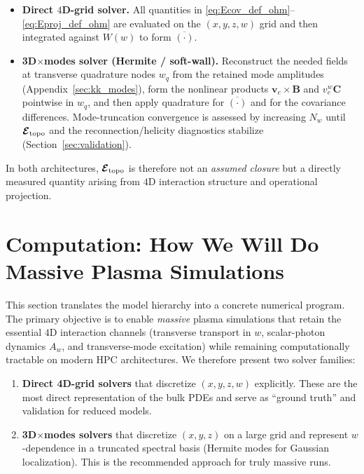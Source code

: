 \documentclass[11pt]{article}
\begin{document}
\begin{itemize}[leftmargin=1.7em]
\item \textbf{Direct \(4\)D-grid solver.}
All quantities in \eqref{eq:Ecov_def_ohm}--\eqref{eq:Eproj_def_ohm} are evaluated on the
\((x,y,z,w)\) grid and then integrated against \(W(w)\) to form \(\overline{(\cdot)}\).

\item \textbf{3D\(\times\)modes solver (Hermite / soft-wall).}
Reconstruct the needed fields at transverse quadrature nodes \(w_q\) from the retained mode amplitudes
(Appendix~\ref{sec:kk_modes}), form the nonlinear products \(\mathbf{v}_e\times\mathbf{B}\) and \(v_e^w\mathbf{C}\) pointwise in \(w_q\),
and then apply quadrature for \(\overline{(\cdot)}\) and for the covariance differences. Mode-truncation convergence is assessed by increasing
\(N_w\) until \(\boldsymbol{\mathcal{E}}_{\rm topo}\) and the reconnection/helicity diagnostics stabilize (Section~\ref{sec:validation}).
\end{itemize}

In both architectures, \(\boldsymbol{\mathcal{E}}_{\rm topo}\) is therefore not an \emph{assumed closure} but a directly measured
quantity arising from \(4\)D interaction structure and operational projection.

\section{Computation: How We Will Do Massive Plasma Simulations}
\label{sec:computation}

This section translates the model hierarchy into a concrete numerical program. The
primary objective is to enable \emph{massive} plasma simulations that retain the
essential \(4\)D interaction channels (transverse transport in \(w\), scalar-photon
dynamics \(A_w\), and transverse-mode excitation) while remaining computationally
tractable on modern HPC architectures. We therefore present two solver families:

\begin{enumerate}[leftmargin=1.6em]
\item \textbf{Direct 4D-grid solvers} that discretize \((x,y,z,w)\) explicitly. These
are the most direct representation of the bulk PDEs and serve as ``ground truth''
and validation for reduced models.

\item \textbf{3D\(\times\)modes solvers} that discretize \((x,y,z)\) on a large grid
and represent \(w\)-dependence in a truncated spectral basis (Hermite modes for
Gaussian localization). This is the recommended approach for truly massive runs.
\end{enumerate}
\end{document}
